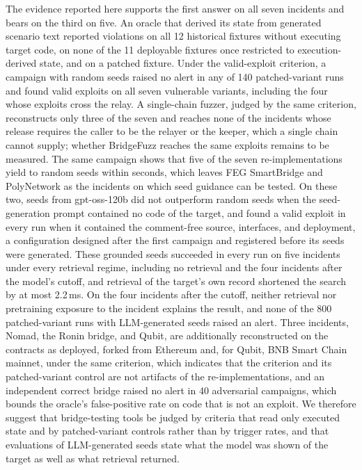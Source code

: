 \documentclass[a4paper]{cas-sc}
\begin{document}
The evidence reported here supports the first answer on all seven incidents and bears on the third on five. An oracle that derived its state from generated scenario text reported violations on all 12 historical fixtures without executing target code, on none of the 11 deployable fixtures once restricted to execution-derived state, and on a patched fixture. Under the valid-exploit criterion, a campaign with random seeds raised no alert in any of 140 patched-variant runs and found valid exploits on all seven vulnerable variants, including the four whose exploits cross the relay. A single-chain fuzzer, judged by the same criterion, reconstructs only three of the seven and reaches none of the incidents whose release requires the caller to be the relayer or the keeper, which a single chain cannot supply; whether BridgeFuzz reaches the same exploits remains to be measured. The same campaign shows that five of the seven re-implementations yield to random seeds within seconds, which leaves FEG SmartBridge and PolyNetwork as the incidents on which seed guidance can be tested. On these two, seeds from gpt-oss-120b did not outperform random seeds when the seed-generation prompt contained no code of the target, and found a valid exploit in every run when it contained the comment-free source, interfaces, and deployment, a configuration designed after the first campaign and registered before its seeds were generated. These grounded seeds succeeded in every run on five incidents under every retrieval regime, including no retrieval and the four incidents after the model's cutoff, and retrieval of the target's own record shortened the search by at most 2.2\,ms. On the four incidents after the cutoff, neither retrieval nor pretraining exposure to the incident explains the result, and none of the 800 patched-variant runs with LLM-generated seeds raised an alert. Three incidents, Nomad, the Ronin bridge, and Qubit, are additionally reconstructed on the contracts as deployed, forked from Ethereum and, for Qubit, BNB Smart Chain mainnet, under the same criterion, which indicates that the criterion and its patched-variant control are not artifacts of the re-implementations, and an independent correct bridge raised no alert in 40 adversarial campaigns, which bounds the oracle's false-positive rate on code that is not an exploit. We therefore suggest that bridge-testing tools be judged by criteria that read only executed state and by patched-variant controls rather than by trigger rates, and that evaluations of LLM-generated seeds state what the model was shown of the target as well as what retrieval returned.
\end{document}
